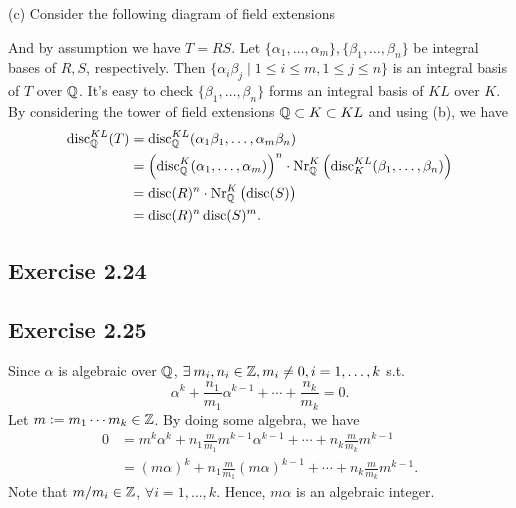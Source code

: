 \documentclass[../Marcus.tex]{subfiles}
\begin{document}
(c) Consider the following diagram of field extensions
\begin{center}
\end{center}
And by assumption we have $T=RS$. Let $\{\alpha_1,\ldots,\alpha_m\},\{\beta_1,\ldots,\beta_n\}$ be integral bases of $R,S$, respectively. Then $\{\alpha_i\beta_j\mid 1\leq i\leq m, 1\leq j\leq n\}$ is an integral basis of $T$ over $\mathbb{Q}$. It's easy to check $\{\beta_1,\ldots,\beta_n\}$ forms an integral basis of $KL$ over $K$. By considering the tower of field extensions $\mathbb{Q}\subset K\subset KL$ and using (b), we have
\begin{align*}
    \operatorname{disc}^{KL}_{\mathbb{Q}}(T) &= \operatorname{disc}^{KL}_{\mathbb{Q}}(\alpha_1\beta_1,\ldots,\alpha_m\beta_n)\\
    &= \left(\operatorname{disc}^K_{\mathbb{Q}}(\alpha_1,\ldots,\alpha_m)\right)^n\cdot \operatorname{Nr}^K_{\mathbb{Q}}\left(\operatorname{disc}^{KL}_K(\beta_1,\ldots,\beta_n)\right)\\
    &= \operatorname{disc}(R)^n\cdot \operatorname{Nr}^K_{\mathbb{Q}}\left(\operatorname{disc}(S)\right)\\
    &= \operatorname{disc}(R)^n\operatorname{disc}(S)^m.
\end{align*}

\subsection*{Exercise 2.24}

\subsection*{Exercise 2.25}

Since $\alpha$ is algebraic over $\mathbb{Q}$, $\exists m_i,n_i \in \ZZ, m_i \neq 0, i=1,\ldots,k$ s.t. 
$$
\alpha^k + \frac{n_1}{m_1}\alpha^{k-1} + \cdots + \frac{n_k}{m_k} = 0.
$$ 
Let $m:=m_1\cdots m_k\in\mathbb{Z}$. By doing some algebra, we have
\begin{align*}
    0 &= m^k\alpha^k + n_1\frac{m}{m_1}m^{k-1}\alpha^{k-1} + \cdots + n_k\frac{m}{m_k}m^{k-1} \\
    &= (m\alpha)^k + n_1\frac{m}{m_1}(m\alpha)^{k-1} + \cdots + n_k\frac{m}{m_k}m^{k-1}.
\end{align*}
Note that $m/m_i \in \mathbb{Z}$, $\forall i=1,\ldots,k$. Hence, $m\alpha$ is an algebraic integer.
\end{document}
